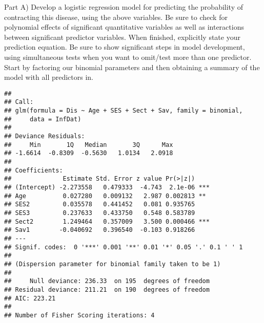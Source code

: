 \documentclass[]{article}
\newenvironment{Shaded}{\begin{snugshade}}{\end{snugshade}}
\newcommand{\KeywordTok}[1]{\textcolor[rgb]{0.13,0.29,0.53}{\textbf{#1}}}
\newcommand{\DataTypeTok}[1]{\textcolor[rgb]{0.13,0.29,0.53}{#1}}
\newcommand{\StringTok}[1]{\textcolor[rgb]{0.31,0.60,0.02}{#1}}
\newcommand{\OperatorTok}[1]{\textcolor[rgb]{0.81,0.36,0.00}{\textbf{#1}}}
\newcommand{\NormalTok}[1]{#1}
\begin{document}
Part A) Develop a logistic regression model for predicting the
probability of contracting this disease, using the above variables. Be
sure to check for polynomial effects of significant quantitative
variables as well as interactions between significant predictor
variables. When finished, explicitly state your prediction equation. Be
sure to show significant steps in model development, using simultaneous
tests when you want to omit/test more than one predictor. Start by
factoring our binomial parameters and then obtaining a summary of the
model with all predictors in.

\begin{Shaded}
\end{Shaded}

\begin{verbatim}
## 
## Call:
## glm(formula = Dis ~ Age + SES + Sect + Sav, family = binomial, 
##     data = InfDat)
## 
## Deviance Residuals: 
##     Min       1Q   Median       3Q      Max  
## -1.6614  -0.8309  -0.5630   1.0134   2.0918  
## 
## Coefficients:
##              Estimate Std. Error z value Pr(>|z|)    
## (Intercept) -2.273558   0.479333  -4.743  2.1e-06 ***
## Age          0.027280   0.009132   2.987 0.002813 ** 
## SES2         0.035578   0.441452   0.081 0.935765    
## SES3         0.237633   0.433750   0.548 0.583789    
## Sect2        1.249464   0.357009   3.500 0.000466 ***
## Sav1        -0.040692   0.396540  -0.103 0.918266    
## ---
## Signif. codes:  0 '***' 0.001 '**' 0.01 '*' 0.05 '.' 0.1 ' ' 1
## 
## (Dispersion parameter for binomial family taken to be 1)
## 
##     Null deviance: 236.33  on 195  degrees of freedom
## Residual deviance: 211.21  on 190  degrees of freedom
## AIC: 223.21
## 
## Number of Fisher Scoring iterations: 4
\end{verbatim}
\end{document}

